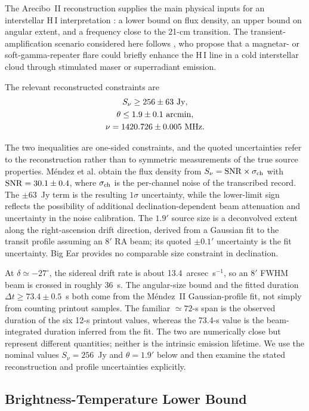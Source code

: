\documentclass[crop]{CSL}
\newcommand{\snu}{S_\nu}
\begin{document}
The Arecibo~II reconstruction supplies the main physical inputs for an interstellar H\,I interpretation \citep{mendez2025}: a lower bound on flux density, an upper bound on angular extent, and a frequency close to the 21-cm transition. The transient-amplification scenario considered here follows \citet{mendez2024}, who propose that a magnetar- or soft-gamma-repeater flare could briefly enhance the H\,I line in a cold interstellar cloud through stimulated maser or superradiant emission.

The relevant reconstructed constraints are
\begin{gather}
\snu\geq256\pm63~{\rm Jy},\nonumber\\
\theta\leq1.9\pm0.1~{\rm arcmin},\nonumber\\
\nu=1420.726\pm0.005~{\rm MHz}.
\end{gather}

The two inequalities are one-sided constraints, and the quoted uncertainties refer to the reconstruction rather than to symmetric measurements of the true source properties. M\'endez et al. obtain the flux density from $\snu={\rm SNR}\times\sigma_{\rm ch}$ with ${\rm SNR}=30.1\pm0.4$, where $\sigma_{\rm ch}$ is the per-channel noise of the transcribed record. The $\pm63$~Jy term is the resulting $1\sigma$ uncertainty, while the lower-limit sign reflects the possibility of additional declination-dependent beam attenuation and uncertainty in the noise calibration. The $1.9'$ source size is a deconvolved extent along the right-ascension drift direction, derived from a Gaussian fit to the transit profile assuming an $8'$ RA beam; its quoted $\pm0.1'$ uncertainty is the fit uncertainty. Big Ear provides no comparable size constraint in declination.

At $\delta\simeq-27^\circ$, the sidereal drift rate is about 13.4~arcsec~s$^{-1}$, so an $8'$ FWHM beam is crossed in roughly 36~s. The angular-size bound and the fitted duration $\Delta t\geq73.4\pm0.5$~s both come from the M\'endez~II Gaussian-profile fit, not simply from counting printout samples. The familiar $\simeq72$-s span is the observed duration of the six 12-s printout values, whereas the 73.4-s value is the beam-integrated duration inferred from the fit. The two are numerically close but represent different quantities; neither is the intrinsic emission lifetime. We use the nominal values $\snu=256$~Jy and $\theta=1.9'$ below and then examine the stated reconstruction and profile uncertainties explicitly.

\subsection{Brightness-Temperature Lower Bound}
\end{document}
